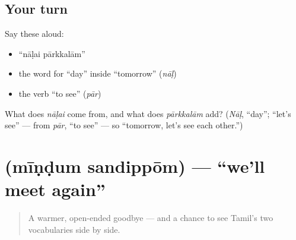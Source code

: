 \subsection*{Your turn}
Say these aloud:

\begin{itemize}
\raggedright
  \item \textquotedblleft{}nāḷai pārkkalām\textquotedblright{}
  \item the word for \textquotedblleft{}day\textquotedblright{} inside \textquotedblleft{}tomorrow\textquotedblright{} (\emph{nāḷ})
  \item the verb \textquotedblleft{}to see\textquotedblright{} (\emph{pār})
\end{itemize}

\begin{tcolorbox}[breakable,colback=teal!4,colframe=teal!35!black,title={Before you move on}]
What does \emph{nāḷai} come from, and what does \emph{pārkkalām} add? (\emph{Nāḷ}, \textquotedblleft{}day\textquotedblright{}; \textquotedblleft{}let's see\textquotedblright{} — from \emph{pār}, \textquotedblleft{}to see\textquotedblright{} — so \textquotedblleft{}tomorrow, let's see each other.\textquotedblright{})
\end{tcolorbox}
\section[\texorpdfstring{\ta{மீண்டும்} \ta{சந்திப்போம்} (mīṇḍum sandippōm)}{மீண்டும் சந்திப்போம் (mīṇḍum sandippōm)}]{  (mīṇḍum sandippōm) — \textquotedblleft{}we'll meet again\textquotedblright{}}

\label{lesson:TA-C04-mindum-sandippom}



\begin{quote}
A warmer, open-ended goodbye — and a chance to see Tamil's two vocabularies side by side.
\end{quote}

